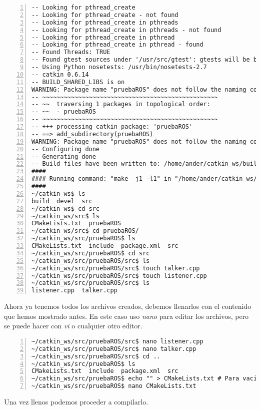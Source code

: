\begin{lstlisting}[style=consola,numbers=left]
-- Looking for pthread_create
-- Looking for pthread_create - not found
-- Looking for pthread_create in pthreads
-- Looking for pthread_create in pthreads - not found
-- Looking for pthread_create in pthread
-- Looking for pthread_create in pthread - found
-- Found Threads: TRUE  
-- Found gtest sources under '/usr/src/gtest': gtests will be built
-- Using Python nosetests: /usr/bin/nosetests-2.7
-- catkin 0.6.14
-- BUILD_SHARED_LIBS is on
WARNING: Package name "pruebaROS" does not follow the naming conventions. It should start with a lower case letter and only contain lower case letters, digits and underscores.
-- ~~~~~~~~~~~~~~~~~~~~~~~~~~~~~~~~~~~~~~~~~~~~~~~~~
-- ~~  traversing 1 packages in topological order:
-- ~~  - pruebaROS
-- ~~~~~~~~~~~~~~~~~~~~~~~~~~~~~~~~~~~~~~~~~~~~~~~~~
-- +++ processing catkin package: 'pruebaROS'
-- ==> add_subdirectory(pruebaROS)
WARNING: Package name "pruebaROS" does not follow the naming conventions. It should start with a lower case letter and only contain lower case letters, digits and underscores.
-- Configuring done
-- Generating done
-- Build files have been written to: /home/ander/catkin_ws/build
####
#### Running command: "make -j1 -l1" in "/home/ander/catkin_ws/build"
####
~/catkin_ws$ ls
build  devel  src
~/catkin_ws$ cd src
~/catkin_ws/src$ ls
CMakeLists.txt  pruebaROS
~/catkin_ws/src$ cd pruebaROS/
~/catkin_ws/src/pruebaROS$ ls
CMakeLists.txt  include  package.xml  src
~/catkin_ws/src/pruebaROS$ cd src
~/catkin_ws/src/pruebaROS/src$ ls
~/catkin_ws/src/pruebaROS/src$ touch talker.cpp
~/catkin_ws/src/pruebaROS/src$ touch listener.cpp
~/catkin_ws/src/pruebaROS/src$ ls
listener.cpp  talker.cpp

	\end{lstlisting}

	Ahora ya tenemos todos los archivos creados, debemos llenarlos con el contenido que hemos mostrado antes. En este caso uso \textit{nano} para editar los archivos, pero se puede hacer con \textit{vi} o cualquier otro editor.

	\begin{lstlisting}[style=consola,numbers=left]
~/catkin_ws/src/pruebaROS/src$ nano listener.cpp
~/catkin_ws/src/pruebaROS/src$ nano talker.cpp
~/catkin_ws/src/pruebaROS/src$ cd ..
~/catkin_ws/src/pruebaROS$ ls
CMakeLists.txt  include  package.xml  src
~/catkin_ws/src/pruebaROS$ echo "" > CMakeLists.txt # Para vaciar el archivo
~/catkin_ws/src/pruebaROS$ nano CMakeLists.txt
	\end{lstlisting}

	Una vez llenos podemos proceder a compilarlo.
	
